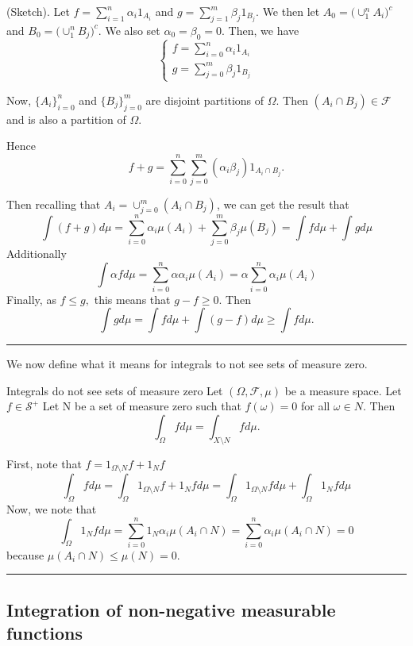 \documentclass[twoside]{article}
\newenvironment{proof}{{\bf Proof:}}{\hfill\rule{2mm}{2mm}}
\begin{document}
\begin{proof}(Sketch). Let $f = \sum_{i=1}^{n}\alpha_i1_{A_{i}}$ and $g = \sum_{j=1}^{m}\beta_j1_{B_{j}}.$ We then let $A_0 = \bigg(\cup_{1}^{n}A_i\bigg)^c$ and $B_0 = \bigg(\cup_{1}^{n}B_j\bigg)^c$. We also set $\alpha_0 = \beta_0 = 0.$ Then, we have 
$$
\begin{cases}
f = \sum_{i=0}^{n}\alpha_i1_{A_{i}}\\
g = \sum_{j=0}^{m}\beta_j1_{B_{j}}
\end{cases}
$$

Now, $\{A_i\}_{i=0}^{n}$ and $\{B_j\}_{j=0}^{m}$ are disjoint partitions of $\Omega$. Then $(A_i \cap B_j) \in \mathcal{F}$ and is also a partition of $\Omega$.

Hence
$$
f + g = \sum_{i=0}^{n}\sum_{j=0}^{m}(\alpha_i \beta_j)1_{A_i \cap B_j}.
$$

Then recalling that $A_i = \cup_{j=0}^{m}(A_i \cap B_j)$, we can get the result that 
$$
\int(f+g)d\mu = \sum_{i=0}^{n}\alpha_i\mu(A_i) + \sum_{j=0}^{m}\beta_j\mu(B_j) = \int fd\mu + \int g d\mu
$$
Additionally
$$
\int \alpha fd\mu = \sum_{i=0}^{n}\alpha \alpha_i \mu(A_i) = \alpha \sum_{i=0}^{n} \alpha_i \mu(A_i)
$$
Finally, as $f \leq g,$ this means that $g - f \geq 0.$ Then 
$$
\int gd\mu = \int fd\mu + \int (g - f)d\mu \geq \int f d\mu.
$$
\end{proof}

We now define what it means for integrals to not see sets of measure zero.

\begin{proposition_exam}{Integrals do not see sets of measure zero}{} Let $(\Omega, \mathcal{F}, \mu)$ be a measure space. Let $f \in \mathcal{S}^+$ Let N be a set of measure zero such that $f(\omega) = 0$ for all $\omega \in N$. Then 
$$
\int_{\Omega}fd\mu = \int_{X \text{\textbackslash} N}fd\mu.
$$
\end{proposition_exam}

\begin{proof} First, note that $f = 1_{\Omega \setminus N}f  + 1_{N}f$
$$
\int_{\Omega}fd\mu = \int_{\Omega}1_{\Omega \setminus N}f  + 1_{N}f d\mu = \int_{\Omega}1_{\Omega \setminus N}f d\mu + \int_{\Omega} 1_{N}f d\mu
$$
Now, we note that 
$$
\int_{\Omega} 1_{N}f d\mu = \sum_{i=0}^{n}1_N \alpha_i \mu(A_i \cap N) = \sum_{i=0}^{n} \alpha_i \mu(A_i \cap N) = 0
$$
because $\mu(A_i \cap N) \leq \mu(N) = 0.$
\end{proof}

\subsection{Integration of non-negative measurable functions}
\end{document}
